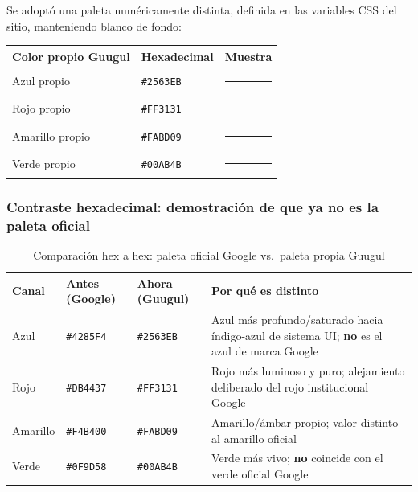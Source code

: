 \documentclass[11pt,a4paper]{article}
\begin{document}
Se adoptó una paleta numéricamente distinta, definida en las variables CSS del sitio, manteniendo blanco de fondo:

\begin{center}
\renewcommand{\arraystretch}{1.35}
\begin{tabular}{@{}llc@{}}
\toprule
\textbf{Color propio Guugul} & \textbf{Hexadecimal} & \textbf{Muestra} \\
\midrule
Azul propio & \texttt{\#2563EB} & \textcolor{OwnBlue}{\rule{1.6cm}{0.55cm}} \\
Rojo propio & \texttt{\#FF3131} & \textcolor{OwnRed}{\rule{1.6cm}{0.55cm}} \\
Amarillo propio & \texttt{\#FABD09} & \textcolor{OwnYellow}{\rule{1.6cm}{0.55cm}} \\
Verde propio & \texttt{\#00AB4B} & \textcolor{OwnGreen}{\rule{1.6cm}{0.55cm}} \\
\bottomrule
\end{tabular}
\end{center}

\subsubsection{Contraste hexadecimal: demostración de que ya no es la paleta oficial}

\begin{table}[h]
\centering
\caption{Comparación hex a hex: paleta oficial Google vs.\ paleta propia Guugul}
\begin{tabular}{@{}p{2.2cm}p{2.8cm}p{2.8cm}p{5.4cm}@{}}
\toprule
\textbf{Canal} & \textbf{Antes (Google)} & \textbf{Ahora (Guugul)} & \textbf{Por qué es distinto} \\
\midrule
Azul & \texttt{\#4285F4} & \texttt{\#2563EB} & Azul más profundo/saturado hacia índigo-azul de sistema UI; \textbf{no} es el azul de marca Google \\
\addlinespace
Rojo & \texttt{\#DB4437} & \texttt{\#FF3131} & Rojo más luminoso y puro; alejamiento deliberado del rojo institucional Google \\
\addlinespace
Amarillo & \texttt{\#F4B400} & \texttt{\#FABD09} & Amarillo/ámbar propio; valor distinto al amarillo oficial \\
\addlinespace
Verde & \texttt{\#0F9D58} & \texttt{\#00AB4B} & Verde más vivo; \textbf{no} coincide con el verde oficial Google \\
\bottomrule
\end{tabular}
\end{table}
\end{document}
